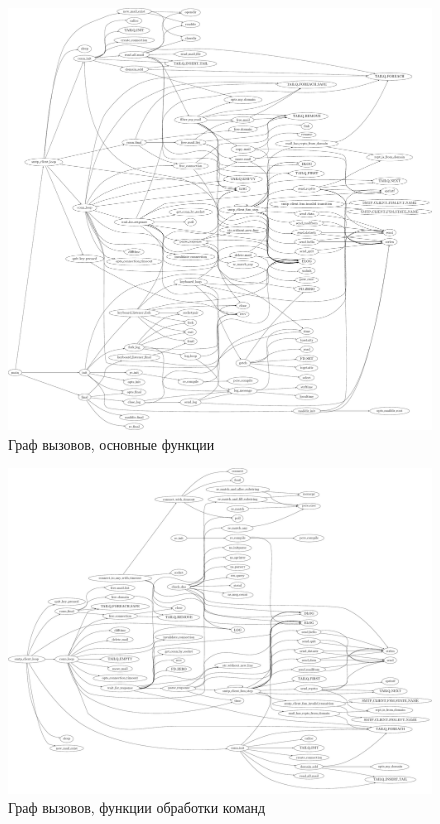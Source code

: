 \documentclass[a4paper,12pt]{report}
\begin{document}
\begin{figure}
\centering
\includegraphics[width=\textwidth]{include/cflow01_dot.pdf}
\caption{Граф вызовов, основные функции}
\label{fig:cflow01}
\end{figure}

\begin{figure}
\centering
\includegraphics[width=\textwidth]{include/cflow02_dot.pdf}
\caption{Граф вызовов, функции обработки команд}
\label{fig:cflow02}
\end{figure}
\end{document}
